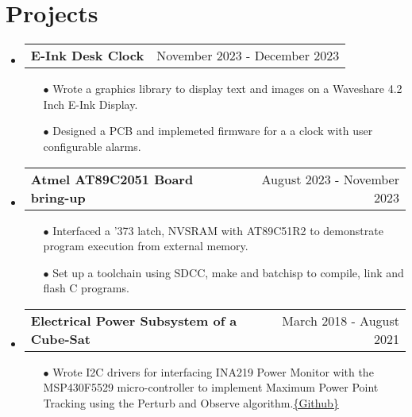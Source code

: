 \documentclass[a4,11pt]{article}
\makeatletter
\newcommand{\resumeSubheadingP}[2]{
  \vspace{-2pt}\item
    \begin{tabular*}{1.0\textwidth}[t]{l@{\extracolsep{\fill}}r}
       \textbf{{\large #1}} &  {#2} \\
    \end{tabular*}\vspace{-1pt}
}
\newcommand{\resumeSubHeadingListStart}{\begin{itemize}[leftmargin=0.0in, label={}]}
\newcommand{\resumeSubHeadingListEnd}{\end{itemize}}
\makeatother
\begin{document}
\section{Projects}
  \resumeSubHeadingListStart
    \resumeSubheadingP
    {E-Ink Desk Clock}{November 2023 - December 2023}
    \begin{itemize}\setlength{\itemsep}{0pt}\setlength{\parskip}{0pt}\vspace{-0.2cm}
            \item[$\bullet$] Wrote a graphics library to display text and images on a Waveshare 4.2 Inch E-Ink Display.
            \item[$\bullet$] Designed a PCB and implemeted firmware for a a clock with user configurable alarms.      
        \end{itemize}
    \resumeSubheadingP
    {Atmel AT89C2051 Board bring-up}{August 2023 - November 2023}
    \begin{itemize}\setlength{\itemsep}{0pt}\setlength{\parskip}{0pt}\vspace{-0.2cm}
            \item[$\bullet$] Interfaced a '373 latch, NVSRAM with AT89C51R2 to demonstrate program execution from external memory.
            \item[$\bullet$] Set up a toolchain using SDCC, make and batchisp to compile, link and flash C programs.      
        \end{itemize}
    \resumeSubheadingP
    {Electrical Power Subsystem of a Cube-Sat}{March 2018 - August 2021}
    \begin{itemize}\setlength{\itemsep}{0pt}\setlength{\parskip}{0pt}\vspace{-0.2cm}
            \item[$\bullet$] Wrote I2C drivers for interfacing INA219 Power Monitor with the MSP430F5529 micro-controller to implement Maximum Power Point Tracking using the Perturb and Observe algorithm.{\href{https://github.com/parthkharade/MSP430F5529}{\{Github\}}}
        \end{itemize}
    \resumeSubHeadingListEnd
\vspace{-16pt}
\end{document}
